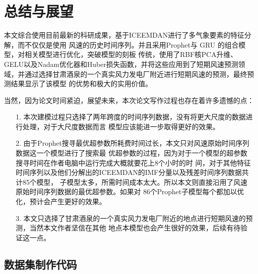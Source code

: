 \documentclass[AutoFakeBold]{LZUThesis}
\begin{document}
\chapter{总结与展望}

本文综合使用目前最新的科研成果，基于ICEEMDAN进行了多气象要素的特征分解，而不仅仅是使用
风速的历史时间序列。并且采用Prophet与 GRU 的组合模型，对相关模型进行优化，突破模型的刻板
传统，使用了RBF核PCA升维、GELU以及Nadam优化器和Huber损失函数，并将这些应用到了短期风速预测领
域，并通过选择甘肃酒泉的一个真实风力发电厂附近进行短期风速的预测，最终预测结果显示了该模型
的优势和极大的实用价值。

当然，因为论文时间紧迫，展望未来，本次论文写作过程也存在着许多遗憾的点：

\begin{itemize}
\item[1.] 本次建模过程只选择了两年跨度的时间序列数据，没有将更大尺度的数据进行处理，对于大尺度数据而言
模型应该能进一步取得更好的效果。
\item[2.] 由于Prophet搜寻最优超参数所耗费时间过长，本文只对风速原始时间序列数据这一个模型进行了搜索最
优超参数的过程，因为对于一个模型的超参数搜寻时间在作者电脑中运行完成大概就要花上8个小时的时
间，对于其他特征时间序列以及他们分解出的ICEEMDAN的IMF分量以及残差时间序列数据共计85个模型，
子模型太多，所需时间成本太大。所以本文则直接沿用了风速原始时间序列数据的最优超参数。如果对
86个Prophet子模型每个都加以优化，预计会产生更好的效果。
\item[3.] 本文只选择了甘肃酒泉的一个真实风力发电厂附近的地点进行短期风速的预测，当然本文作者坚信在其他
地点本模型也会产生很好的效果，后续有待验证这一点。
\end{itemize}

\backmatter


\printbib


\Appendix

\section{数据集制作代码}
\end{document}
